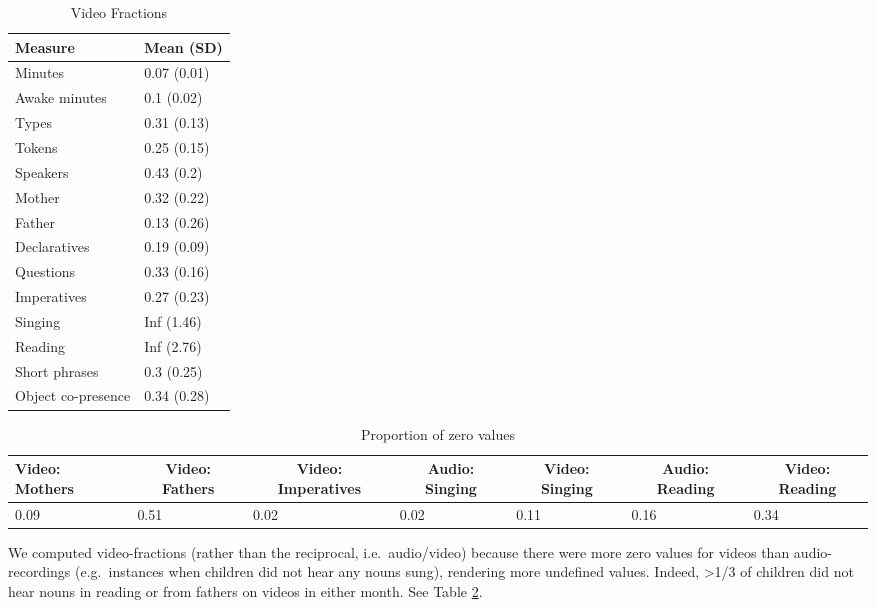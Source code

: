 \documentclass[floatsintext,man]{apa6}
\theoremstyle{definition}
\theoremstyle{definition}
\theoremstyle{definition}
\theoremstyle{remark}
\begin{document}
\begin{table}[tbp]
\begin{center}
\begin{threeparttable}
\caption{\label{tab:vboost-table}Video Fractions}
\begin{tabular}{ll}
\toprule
Measure & \multicolumn{1}{c}{Mean (SD)}\\
\midrule
Minutes & 0.07 (0.01)\\
Awake minutes & 0.1 (0.02)\\
Types & 0.31 (0.13)\\
Tokens & 0.25 (0.15)\\
Speakers & 0.43 (0.2)\\
Mother & 0.32 (0.22)\\
Father & 0.13 (0.26)\\
Declaratives & 0.19 (0.09)\\
Questions & 0.33 (0.16)\\
Imperatives & 0.27 (0.23)\\
Singing & Inf (1.46)\\
Reading & Inf (2.76)\\
Short phrases & 0.3 (0.25)\\
Object co-presence & 0.34 (0.28)\\
\bottomrule
\end{tabular}
\end{threeparttable}
\end{center}
\end{table}

\begin{table}[tbp]
\begin{center}
\begin{threeparttable}
\caption{\label{tab:propna-missing-tables}Proportion of zero values}
\small{
\begin{tabular}{lllllll}
\toprule
Video: Mothers & \multicolumn{1}{c}{Video: Fathers} & \multicolumn{1}{c}{Video: Imperatives} & \multicolumn{1}{c}{Audio: Singing} & \multicolumn{1}{c}{Video: Singing} & \multicolumn{1}{c}{Audio: Reading} & \multicolumn{1}{c}{Video: Reading}\\
\midrule
0.09 & 0.51 & 0.02 & 0.02 & 0.11 & 0.16 & 0.34\\
\bottomrule
\end{tabular}
}
\end{threeparttable}
\end{center}
\end{table}

We computed video-fractions (rather than the reciprocal,
i.e.~audio/video) because there were more zero values for videos than
audio-recordings (e.g.~instances when children did not hear any nouns
sung), rendering more undefined values. Indeed, \textgreater{}1/3 of
children did not hear nouns in reading or from fathers on videos in
either month. See Table \ref{tab:propna-missing-tables}.
\end{document}
